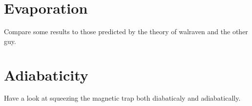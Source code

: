 
\section{Evaporation}

Compare some results to those predicted by the theory of walraven and the other guy.

\section{Adiabaticity}

Have a look at squeezing the magnetic trap both diabaticaly and adiabatically.
